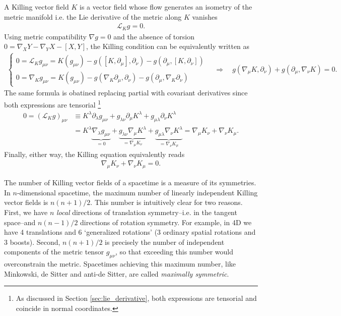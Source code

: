 \documentclass[../geometry_main.tex]{subfiles}
\begin{document}
\begin{mytheorem}
%
A Killing vector field $K$ is a vector field whose flow generates an isometry of the metric manifold i.e. the Lie derivative of the metric along $K$ vanishes
\begin{align}
    \mathcal{L}_K g = 0.
\end{align}
Using metric compatibility $\nabla g=0$ and the absence of torsion $0=\nabla_X Y-\nabla_Y X - [X,Y]$, the Killing condition can be equivalently written as
\begin{align}
    \begin{cases}
    0= \mathcal{L}_K g_{\mu\nu} =K(g_{\mu\nu}) - g([K,\partial_\mu],\partial_\nu) - g(\partial_\mu,[K,\partial_\nu]) \\
    0 = \nabla_K g_{\mu\nu}= K(g_{\mu\nu}) -g(\nabla_K \partial_\mu,\partial_\nu) - g(\partial_\mu, \nabla_K \partial_\nu)
    \end{cases}\quad \Rightarrow \quad g(\nabla_\mu K, \partial_\nu) + g(\partial_\mu, \nabla_\nu K) =0.
\end{align}
The same formula is obatined replacing partial with covariant derivatives since both expressions are tensorial \footnote{As discussed in Section \ref{sec:lie_derivative}, both expressions are tensorial and coincide in normal coordinates.}
\begin{align}
    0=\left(\mathcal{L}_K g\right)_{\mu\nu}&\equiv K^\lambda \partial_\lambda g_{\mu\nu} + g_{\lambda\nu} \partial_\mu K^\lambda + g_{\mu\lambda} \partial_\nu K^\lambda\\
    &= K^\lambda \underbrace{\nabla_\lambda g_{\mu\nu}}_{=0} + \underbrace{g_{\lambda\nu} \nabla_\mu K^\lambda}_{=\nabla_\mu K_\nu} + \underbrace{g_{\mu\lambda} \nabla_\nu K^\lambda}_{=\nabla_\nu K_\mu}
    = \nabla_\mu K_\nu + \nabla_\nu K_\mu.
\end{align}
Finally, either way, the Killing equation equivalently reads
\begin{align}
    \nabla_\mu K_\nu + \nabla_\nu K_\mu = 0.
\end{align}

The number of Killing vector fields of a spacetime is a measure of its symmetries.
In $n$-dimensional spacetime, the maximum number of linearly independent Killing vector fields is $n(n+1)/2$.
This number is intuitively clear for two reasons.
First, we have $n$ \emph{local} directions of translation symmetry--i.e. in the tangent space--and $n(n-1)/2$ directions of rotation symmetry.
For example, in 4D we have 4 translations and 6 `generalized rotations' (3 ordinary spatial rotations and 3 boosts).
Second, $n(n+1)/2$ is precisely the number of independent components of the metric tensor $g_{\mu\nu}$, so that exceeding this number would overconstrain the metric.
Spacetimes achieving this maximum number, like Minkowski, de Sitter and anti-de Sitter, are called \emph{maximally symmetric}.
%
\end{mytheorem}
\end{document}
